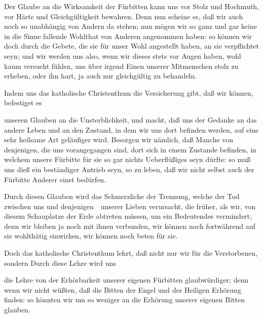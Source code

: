 \begin{aufza}
\begin{aufzb}
\item Der Glaube an die Wirksamkeit der Fürbitten kann uns vor Stolz und Hochmuth, vor Härte und Gleichgültigkeit bewahren. Denn nun scheine es, daß wir auch noch so unabhängig von Andern da stehen; nun mögen wir so ganz und gar keine in die Sinne fallende Wohlthat von Anderen angenommen haben: so können wir doch durch die Gebete, die sie für unser Wohl angestellt haben, an sie verpflichtet seyn; und wir werden uns also, wenn wir dieses stets vor Augen haben, wohl kaum versucht fühlen, uns über irgend Einen unserer Mitmenschen stolz zu erheben, oder ihn hart, ja auch nur gleichgültig zu behandeln.
\end{aufzb}
\item Indem uns das katholische Christenthum die Versicherung gibt, daß wir  können, befestiget es
\begin{aufzb}
\item unseren Glauben an die Unsterblichkeit, und macht, daß uns der Gedanke an das andere Leben und an den Zustand, in dem wir uns dort befinden werden, auf eine sehr heilsame Art geläufiger wird. Besorgen wir nämlich, daß Manche von denjenigen, die uns vorangegangen sind, dort sich in einem Zustande befinden, in welchem unsere Fürbitte für sie so gar nichts Ueberflüßiges seyn dürfte: so muß uns dieß ein beständiger Antrieb seyn, so zu leben, daß wir nicht selbst auch der Fürbitte Anderer einst bedürfen.
\item Durch diesen Glauben wird das Schmerzliche der Trennung, welche der Tod zwischen uns und denjenigen~\ unserer Lieben verursacht, die früher, als wir, von diesem Schauplatze der Erde abtreten müssen, um ein Bedeutendes vermindert; denn wir bleiben ja noch mit ihnen verbunden, wir können noch fortwährend auf sie wohlthätig einwirken, wir können noch beten für sie.
\end{aufzb}
\item Doch das katholische Christenthum lehrt, daß nicht nur wir für die Verstorbenen, sondern  Durch diese Lehre wird uns
\begin{aufzb}
\item die Lehre von der Erhörbarkeit unserer eigenen Fürbitten glaubwürdiger; denn wenn wir nicht wüßten, daß die Bitten der Engel und der Heiligen Erhörung finden: so könnten wir um so weniger an die Erhörung unserer eigenen Bitten glauben.

\end{aufzb}
\end{aufza}

